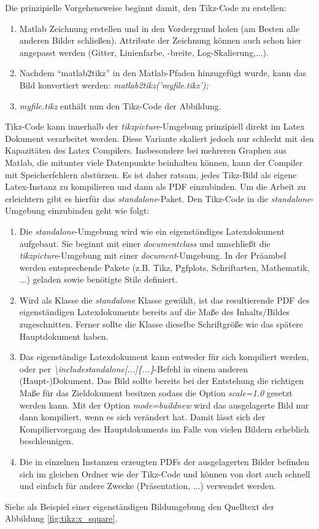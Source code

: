 Die prinzipielle Vorgehensweise beginnt damit, den Tikz-Code zu erstellen:
\begin{enumerate}
	\item Matlab Zeichnung erstellen und in den Vordergrund holen (am Besten alle anderen Bilder schließen).
	Attribute der Zeichnung können auch schon hier angepasst werden (Gitter, Linienfarbe, -breite, Log-Skalierung,...).
	\item Nachdem "`matlab2tikz"' in den Matlab-Pfaden hinzugefügt wurde, kann das Bild konvertiert werden: \textit{matlab2tikz('myfile.tikz');}
	\item \textit{myfile.tikz} enthält nun den Tikz-Code der Abbildung.
\end{enumerate}

Tikz-Code kann innerhalb der \textit{tikzpicture}-Umgebung prinzipiell direkt im Latex Dokument verarbeitet werden.
Diese Variante skaliert jedoch nur schlecht mit den Kapazitäten des Latex Compilers.
Insbesondere bei mehreren Graphen aus Matlab, die mitunter viele Datenpunkte beinhalten können, kann der Compiler mit Speicherfehlern abstürzen.
Es ist daher ratsam, jedes Tikz-Bild als eigene Latex-Instanz zu kompilieren und dann als PDF einzubinden.
Um die Arbeit zu erleichtern gibt es hierfür das \textit{standalone}-Paket.
Den Tikz-Code in die \textit{standalone}-Umgebung einzubinden geht wie folgt:
\begin{enumerate}
	\item Die \textit{standalone}-Umgebung wird wie ein eigenständiges Latexdokument aufgebaut.
	Sie beginnt mit einer \textit{documentclass} und umschließt die \textit{tikzpicture}-Umgebung mit einer \textit{document}-Umgebung.
	In der Präambel werden entsprechende Pakete (z.B. Tikz, Pgfplots, Schriftarten, Mathematik, ...) geladen sowie benötigte Stile definiert.
	\item Wird als Klasse die \textit{standalone} Klasse gewählt, ist das resultierende PDF des eigenständigen Latexdokuments bereits auf die Maße des Inhalts/Bildes zugeschnitten.
	Ferner sollte die Klasse dieselbe Schriftgröße wie das spätere Hauptdokument haben.
	\item Das eigenständige Latexdokument kann entweder für sich kompiliert werden, oder per \textit{\textbackslash includestandalone[...]\{...\}}-Befehl in einem anderen (Haupt-)Dokument.
	Das Bild sollte bereits bei der Entstehung die richtigen Maße für das Zieldokument besitzen sodass die Option \textit{scale=1.0} gesetzt werden kann.
	Mit der Option \textit{mode=buildnew} wird das ausgelagerte Bild nur dann kompiliert, wenn es sich verändert hat.
	Damit lässt sich der Kompiliervorgang des Hauptdokuments im Falle von vielen Bildern erheblich beschleunigen.
	\item Die in einzelnen Instanzen erzeugten PDFs der ausgelagerten Bilder befinden sich im gleichen Ordner wie der Tikz-Code und können von dort auch schnell und einfach für andere Zwecke (Präsentation, ...) verwendet werden.
\end{enumerate}
Siehe als Beispiel einer eigenständigen Bildumgebung den Quelltext der Abbildung \ref{fig:tikz:x_square}.

